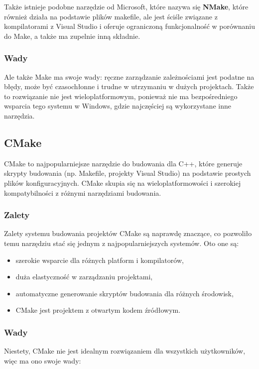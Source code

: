 Także istnieje podobne narzędzie od Microsoft, które nazywa się \textbf{NMake}, które również działa na podstawie plików makefile, ale jest ściśle związane z kompilatorami z Visual Studio i oferuje ograniczoną funkcjonalność w porównaniu do Make, a także ma zupelnie inną składnie.

\subsubsection{Wady}
Ale także Make ma swoje wady: ręczne zarządzanie zależnościami jest podatne na błędy, może być czasochłonne i trudne w utrzymaniu w dużych projektach. Także to rozwiązanie nie jest wieloplatformowym, ponieważ nie ma bezpośredniego wsparcia tego systemu w Windows, gdzie najczęściej są wykorzystane inne narzędzia.

\subsection{CMake}
CMake to najpopularniejsze narzędzie do budowania dla C++, które generuje skrypty budowania (np. Makefile, projekty Visual Studio) na podstawie prostych plików konfiguracyjnych. CMake skupia się na wieloplatformowości i szerokiej kompatybilności z różnymi narzędziami budowania.

\subsubsection{Zalety}
Zalety systemu budowania projektów CMake są naprawdę znaczące, co pozwoliło temu narzędziu stać się jednym z najpopularniejszych systemów. Oto one są:

\begin{itemize}
    \item szerokie wsparcie dla różnych platform i kompilatorów,
    \item duża elastyczność w zarządzaniu projektami,
    \item automatyczne generowanie skryptów budowania dla różnych środowisk,
    \item CMake jest projektem z otwartym kodem źródłowym.
\end{itemize}

\subsubsection{Wady}
Niestety, CMake nie jest idealnym rozwiązaniem dla wszystkich użytkowników, więc ma ono swoje wady:

